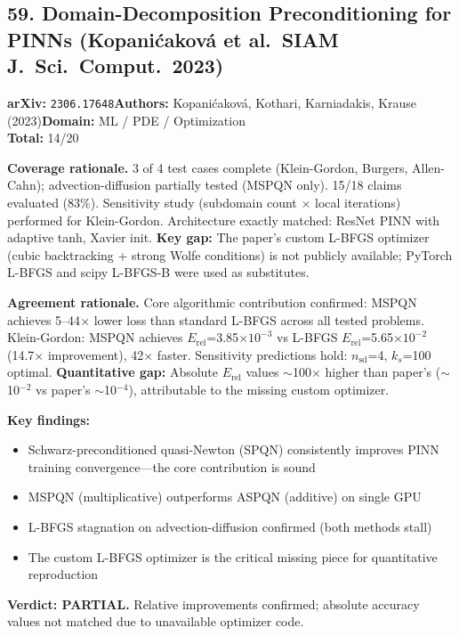 \subsection{59. Domain-Decomposition Preconditioning for PINNs (Kopani\'cakov\'a et al.\ SIAM J.~Sci.~Comput.\ 2023)}
\textbf{arXiv:} \texttt{2306.17648}\quad\textbf{Authors:} Kopani\'cakov\'a, Kothari, Karniadakis, Krause (2023)\quad\textbf{Domain:} ML / PDE / Optimization\\
\quad{}\quad\textbf{Total:} 14/20\par\smallskip
\noindent\textbf{Coverage rationale.} 3 of 4 test cases complete (Klein-Gordon, Burgers, Allen-Cahn); advection-diffusion partially tested (MSPQN only). 15/18 claims evaluated (83\%). Sensitivity study (subdomain count $\times$ local iterations) performed for Klein-Gordon. Architecture exactly matched: ResNet PINN with adaptive tanh, Xavier init. \textbf{Key gap:} The paper's custom L-BFGS optimizer (cubic backtracking + strong Wolfe conditions) is not publicly available; PyTorch L-BFGS and scipy L-BFGS-B were used as substitutes.\par
\noindent\textbf{Agreement rationale.} Core algorithmic contribution confirmed: MSPQN achieves 5--44$\times$ lower loss than standard L-BFGS across all tested problems. Klein-Gordon: MSPQN achieves $E_{\mathrm{rel}}$=3.85$\times 10^{-3}$ vs L-BFGS $E_{\mathrm{rel}}$=5.65$\times 10^{-2}$ (14.7$\times$ improvement), 42$\times$ faster. Sensitivity predictions hold: $n_{\mathrm{sd}}$=4, $k_s$=100 optimal. \textbf{Quantitative gap:} Absolute $E_{\mathrm{rel}}$ values $\sim$100$\times$ higher than paper's ($\sim$10$^{-2}$ vs paper's $\sim$10$^{-4}$), attributable to the missing custom optimizer.\par\smallskip
\noindent\textbf{Key findings:}
\begin{itemize}[leftmargin=1.4em,itemsep=0.2em,topsep=0.2em]
\item Schwarz-preconditioned quasi-Newton (SPQN) consistently improves PINN training convergence---the core contribution is sound
\item MSPQN (multiplicative) outperforms ASPQN (additive) on single GPU
\item L-BFGS stagnation on advection-diffusion confirmed (both methods stall)
\item The custom L-BFGS optimizer is the critical missing piece for quantitative reproduction
\end{itemize}
\noindent\textbf{Verdict: PARTIAL.} Relative improvements confirmed; absolute accuracy values not matched due to unavailable optimizer code.
